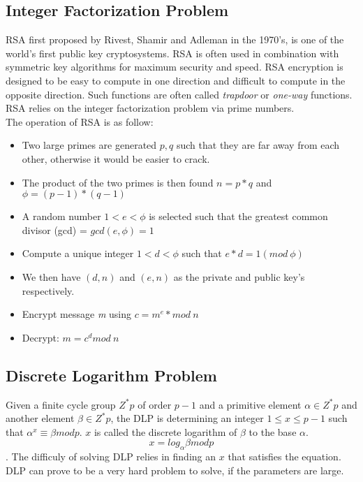 \documentclass[journal]{IEEEtran}
\begin{document}
\subsection{Integer Factorization Problem}
RSA first proposed by Rivest, Shamir and Adleman in the 1970's, is one of the world's first public key cryptosystems. RSA is often used in combination with symmetric key algorithms for 
maximum security and speed. RSA encryption is designed to be easy to compute in one direction and difficult to compute in the opposite direction. Such functions are often called \emph{trapdoor}
or \emph{one-way} functions. RSA relies on the integer factorization problem via prime numbers. \\ 
The operation of RSA is as follow:
\begin{itemize}
  \item Two large primes are generated $p, q$ such that they are far away from each other, otherwise it would be easier to crack.
  \item The product of the two primes is then found $n=p*q$ and $\phi = (p-1)*(q-1)$
  \item A random number $1<e<\phi$ is selected such that the greatest common divisor (gcd) = $gcd(e, \phi) = 1$
  \item Compute a unique integer $1<d<\phi$ such that $e*d = 1(mod~\phi)$
  \item We then have $(d, n)$ and $(e, n)$ as the private and public key's respectively.
  \item Encrypt message \emph{m} using $c=m^e*mod~n$
  \item Decrypt: $m=c^d mod~n$
\end{itemize}

\subsection{Discrete Logarithm Problem}
Given a finite cycle group $Z^*p$ of order $p-1$ and a primitive element $\alpha \in Z^*p$ and another element $\beta \in Z^*p$, the DLP is determining an integer $1 \leq x \leq p-1$
such that $\alpha^x \equiv \beta mod p$. $x$ is called the discrete logarithm of $\beta$ to the base $\alpha$. 
$$x = log_\alpha \beta mod p$$. The difficuly of solving DLP relies in finding an $x$ that satisfies the equation. DLP can prove to be a very hard problem to solve, if the parameters are large.
\end{document}

